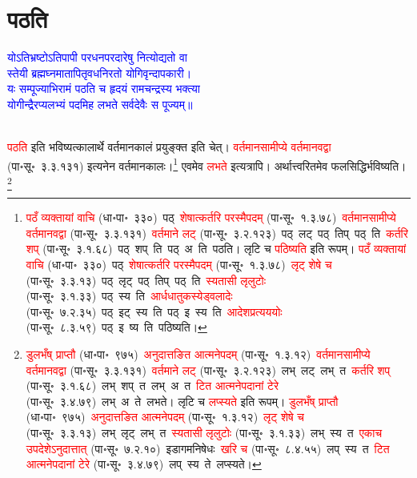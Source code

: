 \section[पठति]{पठति}
\centering\textcolor{blue}{योऽतिभ्रष्टोऽतिपापी परधनपरदारेषु नित्योद्यतो वा\nopagebreak\\
स्तेयी ब्रह्मघ्नमातापितृवधनिरतो योगिवृन्दापकारी।\nopagebreak\\
यः सम्पूज्याभिरामं पठति च हृदयं रामचन्द्रस्य भक्त्या\nopagebreak\\
योगीन्द्रैरप्यलभ्यं पदमिह लभते सर्वदेवैः स पूज्यम्॥}\nopagebreak\\
\\
\fontsize{14}{21}\selectfont\begin{sloppypar}\justifying\noindent\hspace{10mm} \textcolor{red}{पठति} इति भविष्यत्कालार्थे वर्तमान\-कालं प्रयुङ्क्त इति चेत्। \textcolor{red}{वर्तमान\-सामीप्ये वर्तमानवद्वा} (पा॰सू॰~३.३.१३१) इत्यनेन वर्तमान\-कालः।\footnote{\textcolor{red}{पठँ व्यक्तायां वाचि} (धा॰पा॰~३३०)~\arrow पठ्~\arrow \textcolor{red}{शेषात्कर्तरि परस्मैपदम्} (पा॰सू॰~१.३.७८)~\arrow \textcolor{red}{वर्तमान\-सामीप्ये वर्तमानवद्वा} (पा॰सू॰~३.३.१३१)~\arrow \textcolor{red}{वर्तमाने लट्} (पा॰सू॰~३.२.१२३)~\arrow पठ्~लट्~\arrow पठ्~तिप्~\arrow पठ्~ति~\arrow \textcolor{red}{कर्तरि शप्} (पा॰सू॰~३.१.६८)~\arrow पठ्~शप्~ति~\arrow पठ्~अ~ति~\arrow पठति। लृटि च \textcolor{red}{पठिष्यति} इति रूपम्। \textcolor{red}{पठँ व्यक्तायां वाचि} (धा॰पा॰~३३०)~\arrow पठ्~\arrow \textcolor{red}{शेषात्कर्तरि परस्मैपदम्} (पा॰सू॰~१.३.७८)~\arrow \textcolor{red}{लृट् शेषे च} (पा॰सू॰~३.३.१३)~\arrow पठ्~लृट्~\arrow पठ्~तिप्~\arrow पठ्~ति~\arrow \textcolor{red}{स्यतासी लृलुटोः} (पा॰सू॰~३.१.३३)~\arrow पठ्~स्य~ति~\arrow \textcolor{red}{आर्धधातुकस्येड्वलादेः} (पा॰सू॰~७.२.३५)~\arrow पठ्~इट्~स्य~ति~\arrow पठ्~इ~स्य~ति~\arrow \textcolor{red}{आदेश\-प्रत्यययोः} (पा॰सू॰~८.३.५९)~\arrow पठ्~इ~ष्य~ति~\arrow पठिष्यति।} एवमेव \textcolor{red}{लभते} इत्यत्रापि। अर्थात्त्वरितमेव फलसिद्धिर्भविष्यति।\footnote{\textcolor{red}{डुलभँष् प्राप्तौ} (धा॰पा॰~९७५)~\arrow \textcolor{red}{अनुदात्तङित आत्मने\-पदम्} (पा॰सू॰~१.३.१२)~\arrow \textcolor{red}{वर्तमान\-सामीप्ये वर्तमानवद्वा} (पा॰सू॰~३.३.१३१)~\arrow \textcolor{red}{वर्तमाने लट्} (पा॰सू॰~३.२.१२३)~\arrow लभ्~लट्~\arrow लभ्~त~\arrow \textcolor{red}{कर्तरि शप्} (पा॰सू॰~३.१.६८)~\arrow लभ्~शप्~त~\arrow लभ्~अ~त~\arrow \textcolor{red}{टित आत्मनेपदानां टेरे} (पा॰सू॰~३.४.७९)~\arrow लभ्~अ~ते~\arrow लभते। लृटि च \textcolor{red}{लप्स्यते} इति रूपम्। \textcolor{red}{डुलभँष् प्राप्तौ} (धा॰पा॰~९७५)~\arrow \textcolor{red}{अनुदात्तङित आत्मने\-पदम्} (पा॰सू॰~१.३.१२)~\arrow \textcolor{red}{लृट् शेषे च} (पा॰सू॰~३.३.१३)~\arrow लभ्~लृट्~\arrow लभ्~त~\arrow \textcolor{red}{स्यतासी लृलुटोः} (पा॰सू॰~३.१.३३)~\arrow लभ्~स्य~त~\arrow \textcolor{red}{एकाच उपदेशेऽनुदात्तात्‌} (पा॰सू॰~७.२.१०)~\arrow इडागम\-निषेधः~\arrow \textcolor{red}{खरि च} (पा॰सू॰~८.४.५५)~\arrow लप्~स्य~त~\arrow \textcolor{red}{टित आत्मनेपदानां टेरे} (पा॰सू॰~३.४.७९)~\arrow लप्~स्य~ते~\arrow लप्स्यते।}\end{sloppypar}
